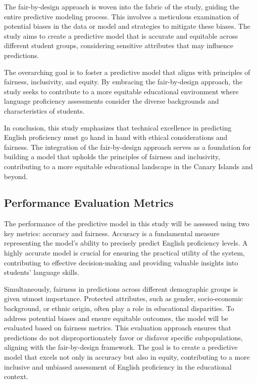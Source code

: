 \documentclass[12pt,a4paper,openright,twoside]{book}
\begin{document}
The fair-by-design approach is woven into the fabric of the study, guiding the entire predictive modeling process. This involves a meticulous examination of potential biases in the data or model and strategies to mitigate these biases. The study aims to create a predictive model that is accurate and equitable across different student groups, considering sensitive attributes that may influence predictions.

The overarching goal is to foster a predictive model that aligns with principles of fairness, inclusivity, and equity. By embracing the fair-by-design approach, the study seeks to contribute to a more equitable educational environment where language proficiency assessments consider the diverse backgrounds and characteristics of students.

In conclusion, this study emphasizes that technical excellence in predicting English proficiency must go hand in hand with ethical considerations and fairness. The integration of the fair-by-design approach serves as a foundation for building a model that upholds the principles of fairness and inclusivity, contributing to a more equitable educational landscape in the Canary Islands and beyond.

\subsection{Performance Evaluation Metrics}

The performance of the predictive model in this study will be assessed using two key metrics: accuracy and fairness. Accuracy is a fundamental measure representing the model's ability to precisely predict English proficiency levels. A highly accurate model is crucial for ensuring the practical utility of the system, contributing to effective decision-making and providing valuable insights into students' language skills.

Simultaneously, fairness in predictions across different demographic groups is given utmost importance. Protected attributes, such as gender, socio-economic background, or ethnic origin, often play a role in educational disparities. To address potential biases and ensure equitable outcomes, the model will be evaluated based on fairness metrics. This evaluation approach ensures that predictions do not disproportionately favor or disfavor specific subpopulations, aligning with the fair-by-design framework. The goal is to create a predictive model that excels not only in accuracy but also in equity, contributing to a more inclusive and unbiased assessment of English proficiency in the educational context.
\end{document}
